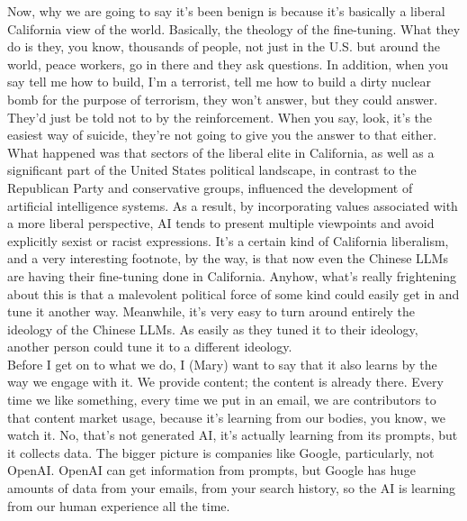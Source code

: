 \documentclass[english]{textolivre}
\begin{document}
{    Now, why we are going to say it’s been benign is because it’s basically a liberal California view of the world. Basically, the theology of the fine-tuning. What they do is they, you know, thousands of people, not just in the U.S. but around the world, peace workers, go in there and they ask questions. In addition, when you say tell me how to build, I’m a terrorist, tell me how to build a dirty nuclear bomb for the purpose of terrorism, they won’t answer, but they could answer. They’d just be told not to by the reinforcement. When you say, look, it’s the easiest way of suicide, they’re not going to give you the answer to that either. What happened was that sectors of the liberal elite in California, as well as a significant part of the United States political landscape, in contrast to the Republican Party and conservative groups, influenced the development of artificial intelligence systems. As a result, by incorporating values associated with a more liberal perspective, AI tends to present multiple viewpoints and avoid explicitly sexist or racist expressions. It’s a certain kind of California liberalism, and a very interesting footnote, by the way, is that now even the Chinese LLMs are having their fine-tuning done in California. Anyhow, what’s really frightening about this is that a malevolent political force of some kind could easily get in and tune it another way. Meanwhile, it’s very easy to turn around entirely the ideology of the Chinese LLMs. As easily as they tuned it to their ideology, another person could tune it to a different ideology.\\
    Before I get on to what we do, I (Mary) want to say that it also learns by the way we engage with it. We provide content; the content is already there. Every time we like something, every time we put in an email, we are contributors to that content market usage, because it’s learning from our bodies, you know, we watch it. No, that’s not generated AI, it’s actually learning from its prompts, but it collects data. The bigger picture is companies like Google, particularly, not OpenAI. OpenAI can get information from prompts, but Google has huge amounts of data from your emails, from your search history, so the AI is learning from our human experience all the time.\\
}
\end{document}
